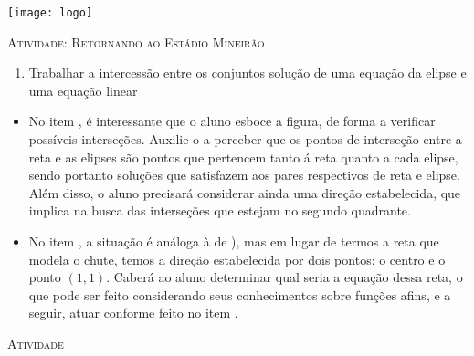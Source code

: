 \documentclass[10 pt,usenames,dvipsnames, oneside]{article}
\begin{document}
\begin{center}
  \begin{minipage}[l]{3cm}
\texttt{[image: logo]}    
\end{minipage}\hfill
\begin{minipage}[r]{.8\textwidth}
 {\Large \scshape Atividade: Retornando ao Estádio Mineirão}  
\end{minipage}
\end{center}
\vspace{.2cm}

\ifdefined\prof

\begin{goals}
\begin{enumerate}
\item Trabalhar a intercessão entre os  conjuntos solução de uma equação da elipse e uma equação linear
\end{enumerate}

\tcblower

\begin{itemize}
\item No item , é interessante que o aluno esboce a figura, de forma a verificar possíveis interseções. Auxilie-o a perceber que os pontos de interseção entre a reta e as elipses são pontos que pertencem tanto á reta quanto a cada elipse, sendo portanto soluções que satisfazem aos pares respectivos de reta e elipse. Além disso, o aluno precisará considerar ainda uma direção estabelecida, que implica na busca das interseções que estejam no segundo quadrante.
\item No item  , a situação é análoga à de ), mas em lugar de termos a reta que modela o chute, temos a direção estabelecida por dois pontos: o centro e o ponto $(1,1)$. Caberá ao aluno determinar qual seria a equação dessa reta, o que pode ser feito considerando seus conhecimentos sobre funções afins, e a seguir, atuar conforme feito no item .
\end{itemize}
\end{goals}

\bigskip
\begin{center}
{\large \scshape Atividade}
\end{center}
\fi
\end{document}
